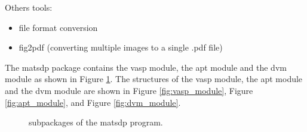 \documentclass[12pt]{book}
\begin{document}
Others tools:
\begin{itemize}
\item file format conversion
\item fig2pdf (converting multiple images to a single .pdf file)
\end{itemize}

%
%
%

The matsdp package contains the vasp module, the apt module and the dvm module as shown in Figure \ref{fig:matsdp_main_structure}. The structures of the vasp module, the apt module and the dvm module are shown in Figure \ref{fig:vasp_module}, Figure \ref{fig:apt_module}, and Figure \ref{fig:dvm_module}.

\begin{figure}[htbp]
\centering
{}
\caption{\label{fig:matsdp_main_structure} subpackages of the matsdp program.}
\end{figure}
\end{document}
